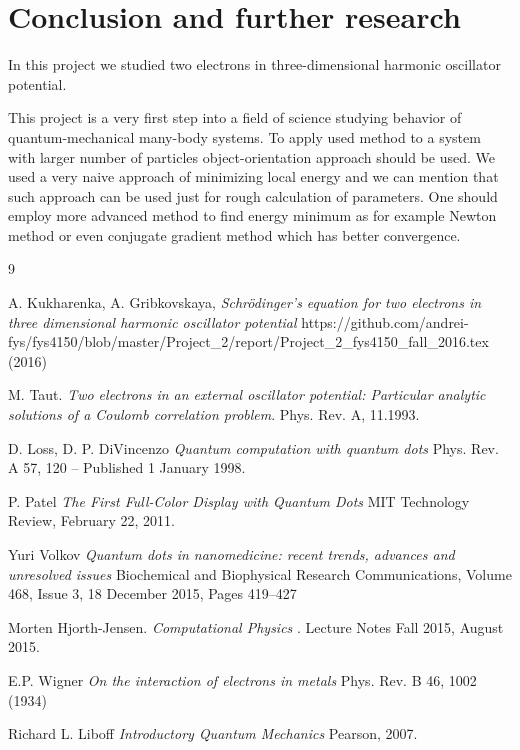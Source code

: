 \documentclass[10pt]{article}
\begin{document}
\newpage
\clearpage
\section{Conclusion and further research}\label{conc}
In this project we studied two electrons in three-dimensional harmonic oscillator potential.

This project is a very first step into a field of science studying behavior of quantum-mechanical many-body systems. To apply used method to a system with larger number of particles object-orientation approach should be used. We used a very naive approach of minimizing local energy and we can mention that such approach can be used just for rough calculation of parameters. One should employ more advanced method to find energy minimum as for example Newton method or even conjugate gradient method which has better convergence. 
\newpage

\begin{thebibliography} {9}

A. Kukharenka, A. Gribkovskaya,
\textit
{Schr\"{o}dinger's equation for two electrons in three dimensional harmonic oscillator potential
}
https://github.com/andrei-fys/fys4150/blob/master/Project\_2/report/Project\_2\_fys4150\_fall\_2016.tex (2016)


M. Taut. 
\textit{Two electrons in an external oscillator potential: Particular analytic solutions of a Coulomb correlation problem}.
Phys. Rev. A, 11.1993.


D. Loss, D. P. DiVincenzo
\textit{
Quantum computation with quantum dots
}
Phys. Rev. A 57, 120 – Published 1 January 1998.

P. Patel
\textit
{The First Full-Color Display with Quantum Dots
}
MIT Technology Review, February 22, 2011.

Yuri Volkov
\textit
{Quantum dots in nanomedicine: recent trends, advances and unresolved issues
}
Biochemical and Biophysical Research Communications, Volume 468, Issue 3, 18 December 2015, Pages 419–427

Morten Hjorth-Jensen. 
\textit{Computational Physics
}. 
Lecture Notes Fall 2015, August 2015.


E.P. Wigner
\textit
{On the interaction of electrons in metals
}
Phys. Rev. B 46, 1002 (1934) 

Richard L. Liboff
\textit
{Introductory Quantum Mechanics
}
Pearson, 2007.


\end{thebibliography}
\end{document}
